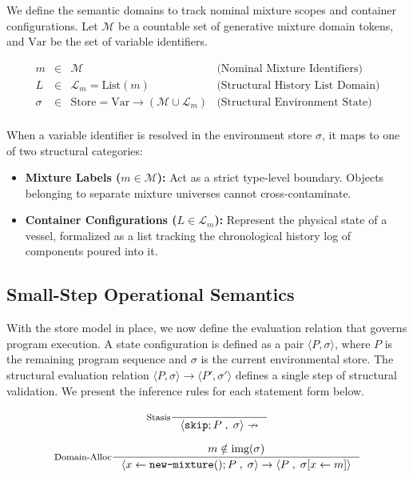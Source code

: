 \documentclass[11pt, a4paper]{article}
\begin{document}
We define the semantic domains to track nominal mixture scopes and container configurations. Let $\mathcal{M}$ be a countable set of generative mixture domain tokens, and $\text{Var}$ be the set of variable identifiers. 

\[
\begin{array}{rclr}
m &\in& \mathcal{M} & \text{(Nominal Mixture Identifiers)} \\
L &\in& \mathcal{L}_m = \text{List}(m) & \text{(Structural History List Domain)} \\
\sigma &\in& \text{Store} = \text{Var} \to (\mathcal{M} \cup \mathcal{L}_m) & \text{(Structural Environment State)} \\
\end{array}
\]

When a variable identifier is resolved in the environment store $\sigma$, it maps to one of two structural categories:
\begin{itemize}
    \item \textbf{Mixture Labels ($m \in \mathcal{M}$):} Act as a strict type-level boundary. Objects belonging to separate mixture universes cannot cross-contaminate.
    \item \textbf{Container Configurations ($L \in \mathcal{L}_m$):} Represent the physical state of a vessel, formalized as a list tracking the chronological history log of components poured into it.
\end{itemize}

\subsection{Small-Step Operational Semantics}
With the store model in place, we now define the evaluation relation that governs program execution. A state configuration is defined as a pair $\langle P, \sigma \rangle$, where $P$ is the remaining program sequence and $\sigma$ is the current environmental store. The structural evaluation relation $\langle P, \sigma \rangle \to \langle P', \sigma' \rangle$ defines a single step of structural validation. We present the inference rules for each statement form below. 

\[
\inference[\text{Stasis}]{}
{\langle \text{\texttt{skip}} ; P \;,\; \sigma \rangle \nrightarrow }
\]

\[
\inference[\text{Domain-Alloc}]{m \notin \text{img}(\sigma)}
{\langle x \leftarrow \text{\texttt{new-mixture}}() ; P \;,\; \sigma \rangle \to \langle P \;,\; \sigma[x \leftarrow m] \rangle}
\]
\end{document}
